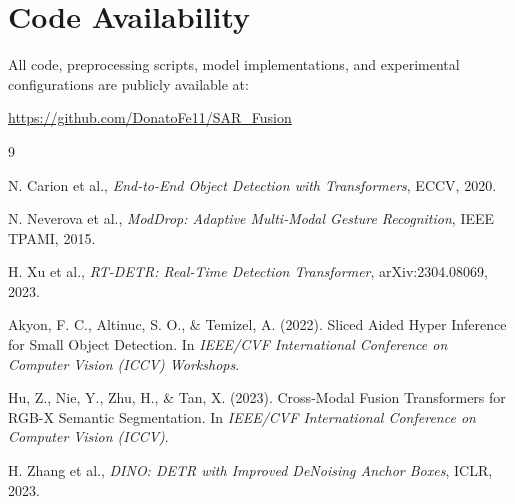 \documentclass[a4paper,12pt]{article}
\begin{document}
\section{Code Availability}

All code, preprocessing scripts, model implementations, and experimental configurations are publicly available at:

\noindent \url{https://github.com/DonatoFe11/SAR_Fusion}

\begin{thebibliography}{9}

N. Carion et al.,
\textit{End-to-End Object Detection with Transformers},
ECCV, 2020.

N. Neverova et al.,
\textit{ModDrop: Adaptive Multi-Modal Gesture Recognition},
IEEE TPAMI, 2015.

H. Xu et al.,
\textit{RT-DETR: Real-Time Detection Transformer},
arXiv:2304.08069, 2023.

 Akyon, F. C., Altinuc, S. O., \& Temizel, A. (2022). Sliced Aided Hyper Inference for Small Object Detection. 
In \textit{IEEE/CVF International Conference on Computer Vision (ICCV) Workshops}.

Hu, Z., Nie, Y., Zhu, H., \& Tan, X. (2023). Cross-Modal Fusion Transformers for RGB-X Semantic Segmentation. 
In \textit{IEEE/CVF International Conference on Computer Vision (ICCV)}.

H. Zhang et al.,
\textit{DINO: DETR with Improved DeNoising Anchor Boxes},
ICLR, 2023.

\end{thebibliography}
\end{document}
